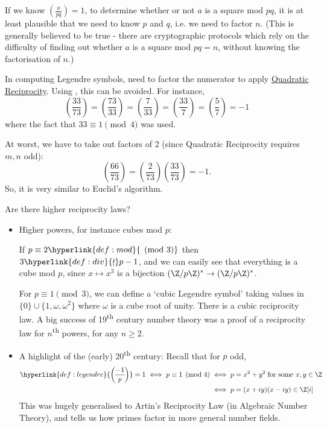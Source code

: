 \documentclass{article}
\newcommand{\legendre}[2]{\genfrac{(}{)}{}{}{#1}{#2}}
\begin{document}
If we know $\legendre{a}{pq} = 1$, to determine whether or not $a$ is a square mod $pq$, it is at least plausible that we need to know $p$ and $q$, i.e. we need to factor $n$.
(This is generally believed to be true - there are cryptographic protocols which rely on the difficulty of finding out whether $a$ is a square mod $pq=n$, without knowing the factorisation of $n$.)

In computing Legendre symbols, need to factor the numerator to apply \hyperlink{thm:qr}{Quadratic Reciprocity}.
Using , this can be avoided. For instance,
\begin{equation*}
    \legendre{33}{73} = \legendre{73}{33} = \legendre{7}{33} = \legendre{33}{7} = \legendre{5}{7} = -1
\end{equation*}
where the fact that $33 \equiv 1 \pmod{4}$ was used.

At worst, we have to take out factors of 2 (since Quadratic Reciprocity requires $m, n$ odd):
\begin{equation*}
    \legendre{66}{73} = \legendre{2}{73} \legendre{33}{73} = -1.
\end{equation*}
So, it is very similar to Euclid's algorithm.

Are there higher reciprocity laws?
\begin{itemize}
    \item Higher powers, for instance cubes mod $p$:

        If $p \equiv 2 \hyperlink{def:mod}{\pmod{3}}$ then $3 \hyperlink{def:div}{\nmid} p-1$, and we can easily see that everything is a cube mod $p$, since $x \mapsto x^3$ is a bijection $(\Z/p\Z)^* \to (\Z/p\Z)^*$.

        For $p \equiv 1 \pmod{3}$, we can define a `cubic Legendre symbol' taking values in $\{0\} \cup \{1, \omega, \omega^2\}$ where $\omega$ is a cube root of unity.
        There is a cubic reciprocity law.
        A big success of 19\textsuperscript{th} century number theory was a proof of a reciprocity law for $n$\textsuperscript{th} powers, for any $n \geq 2$.
    \item A highlight of the (early) 20\textsuperscript{th} century:
        Recall that for $p$ odd,
        \begin{align*}
            \hyperlink{def:legendre}{\legendre{-1}{p}} = 1 \iff p \equiv 1 \pmod{4} &\iff p = x^2 + y^2 \; \text{for some } x, y \in \Z \\
            &\iff p = (x+iy)(x-iy) \in \Z[i]
        \end{align*}
        This was hugely generalised to Artin's Reciprocity Law (in Algebraic Number Theory), and tells us how primes factor in more general number fields.
\end{itemize}
\end{document}
